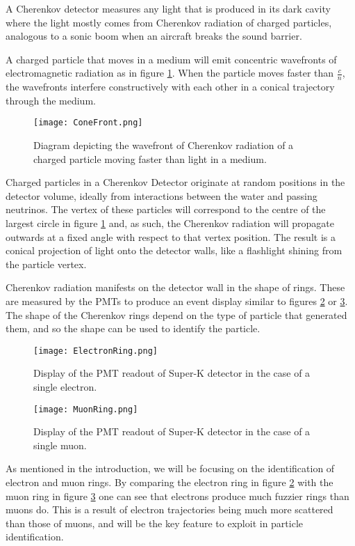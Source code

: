 \documentclass[twoside,twocolumn]{article}
\begin{document}
A Cherenkov detector measures any light that is produced in its dark cavity where the light mostly comes from Cherenkov radiation of charged particles, analogous to a sonic boom when an aircraft breaks the sound barrier.

A charged particle that moves in a medium will emit concentric wavefronts of electromagnetic radiation as in figure \ref{fig:ConeFront}. When the particle moves faster than $\frac{c}{n}$, the wavefronts interfere constructively with each other in a conical trajectory through the medium.

\begin{figure}[ht]
    \centering
    \texttt{[image: ConeFront.png]}
    \caption{Diagram depicting the wavefront of Cherenkov radiation of a charged particle moving faster than light in a medium.}
    \label{fig:ConeFront}
\end{figure}

Charged particles in a Cherenkov Detector originate at random positions in the detector volume, ideally from interactions between the water and passing neutrinos. The vertex of these particles will correspond to the centre of the largest circle in figure \ref{fig:ConeFront} and, as such, the Cherenkov radiation will propagate outwards at a fixed angle with respect to that vertex position. The result is a conical projection of light onto the detector walls, like a flashlight shining from the particle vertex.

Cherenkov radiation manifests on the detector wall in the shape of rings. These are measured by the PMTs to produce an event display similar to figures \ref{fig:ElectronRing} or \ref{fig:MuonRing}. The shape of the Cherenkov rings depend on the type of particle that generated them, and so the shape can be used to identify the particle.

\begin{figure}[ht]
    \centering
    \texttt{[image: ElectronRing.png]}
    \caption{Display of the PMT readout of Super-K detector in the case of a single electron.}
    \label{fig:ElectronRing}
\end{figure}

\begin{figure}[ht]
    \centering
    \texttt{[image: MuonRing.png]}
    \caption{Display of the PMT readout of Super-K detector in the case of a single muon.}
    \label{fig:MuonRing}
\end{figure}

As mentioned in the introduction, we will be focusing on the identification of electron and muon rings. By comparing the electron ring in figure \ref{fig:ElectronRing} with the muon ring in figure \ref{fig:MuonRing} one can see that electrons produce much fuzzier rings than muons do. This is a result of electron trajectories being much more scattered than those of muons, and will be the key feature to exploit in particle identification.
\end{document}
